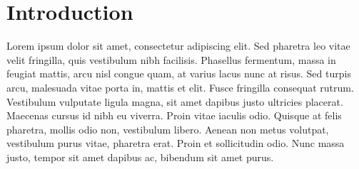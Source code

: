 \documentclass[main.tex]{subfiles}
\begin{document}
\chapter{Introduction}

Lorem ipsum dolor sit amet, consectetur adipiscing elit. Sed pharetra leo vitae velit fringilla, quis vestibulum nibh facilisis. Phasellus fermentum, massa in feugiat mattis, arcu nisl congue quam, at varius lacus nunc at risus. Sed turpis arcu, malesuada vitae porta in, mattis et elit. Fusce fringilla consequat rutrum. Vestibulum vulputate ligula magna, sit amet dapibus justo ultricies placerat. Maecenas cursus id nibh eu viverra. Proin vitae iaculis odio. Quisque at felis pharetra, mollis odio non, vestibulum libero. Aenean non metus volutpat, vestibulum purus vitae, pharetra erat. Proin et sollicitudin odio. Nunc massa justo, tempor sit amet dapibus ac, bibendum sit amet purus.
\end{document}
